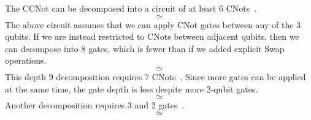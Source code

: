 The CCNot can be decomposed into a circuit of at least 6 CNots~\cite{Nielsen2000a}.
$$ \simeq

$$
The above circuit assumes that we can apply CNot gates between any of the 3 qubits. If we are instead restricted to CNots between adjacent qubits, then we can decompose into 8  gates, which is fewer than if we added explicit Swap operations. 
 $$ \simeq

$$
This depth 9 decomposition requires 7 CNots~\cite{Amy2013a}. Since more gates can be applied at the same time, the gate depth is less despite more 2-qubit gates.
$$ \simeq

$$
Another decomposition requires 3  and 2  gates~\cite{???}.
$$ \simeq

$$



